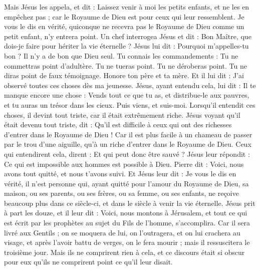 \begin{multicols}{2}
Mais Jésus les appela, et dit : Laissez venir à moi les petits enfants, et ne les en empêchez pas ; car le Royaume de Dieu est pour ceux qui leur ressemblent.
Je vous le dis en vérité, quiconque ne recevra pas le Royaume de Dieu comme un petit enfant, n'y entrera point.
Un chef interrogea Jésus et dit : Bon Maître, que dois-je faire pour hériter la vie éternelle ?
Jésus lui dit : Pourquoi m'appelles-tu bon ? Il n'y a de bon que Dieu seul.
Tu connais les commandements : Tu ne commettras point d’adultère. Tu ne tueras point. Tu ne déroberas point. Tu ne diras point de faux témoignage. Honore ton père et ta mère.
Et il lui dit : J’ai observé toutes ces choses dès ma jeunesse.
Jésus, ayant entendu cela, lui dit : Il te manque encore une chose : Vends tout ce que tu as, et distribue-le aux pauvres, et tu auras un trésor dans les cieux. Puis viens, et suis-moi.
Lorsqu’il entendit ces choses, il devint tout triste, car il était extrêmement riche.
Jésus voyant qu'il était devenu tout triste, dit : Qu’il est difficile à ceux qui ont des richesses d’entrer dans le Royaume de Dieu !
Car il est plus facile à un chameau de passer par le trou d'une aiguille, qu’à un riche d’entrer dans le Royaume de Dieu.
Ceux qui entendirent cela, dirent : Et qui peut donc être sauvé ?
Jésus leur répondit : Ce qui est impossible aux hommes est possible à Dieu.
Pierre dit : Voici, nous avons tout quitté, et nous t'avons suivi.
Et Jésus leur dit : Je vous le dis en vérité, il n’est personne qui, ayant quitté pour l'amour du Royaume de Dieu, sa maison, ou ses parents, ou ses frères, ou sa femme, ou ses enfants,
ne reçoive beaucoup plus dans ce siècle-ci, et dans le siècle à venir la vie éternelle.
Jésus prit à part les douze, et il leur dit : Voici, nous montons à Jérusalem, et tout ce qui est écrit par les prophètes au sujet du Fils de l'homme, s’accomplira.
Car il sera livré aux Gentils ; on se moquera de lui, on l’outragera, et on lui crachera au visage,
et après l’avoir battu de verges, on le fera mourir ; mais il ressuscitera le troisième jour.
Mais ils ne comprirent rien à cela, et ce discours était si obscur pour eux qu'ils ne comprirent point ce qu'il leur disait.

\end{multicols}
